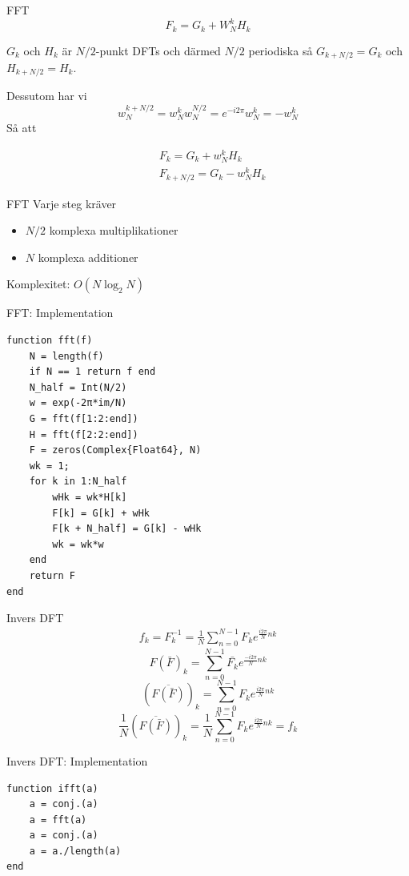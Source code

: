 \documentclass[presentation]{beamer}
\begin{document}
\begin{frame}[label={sec:orgf4f9786}]{FFT}
\[ F_{k} = G_{k} + W_{N}^{k}H_{k} \]

\(G_{k}\) och \(H_{k}\) är \(N/2\)-punkt DFTs och därmed \(N/2\) periodiska så
\(G_{k + N/2} = G_{k}\) och \(H_{k + N/2} = H_{k}\).

Dessutom har vi
\[ w_{N}^{k + N/2} = w_{N}^{k}w_{N}^{N/2} = e^{-i2 \pi}w_{N}^{k} = -w_{N}^{k} \]
Så att  

\begin{align*}
&F_{k} = G_{k} + w_{N}^{k}H_{k} \\
&F_{k + N/2} = G_{k} - w_{N}^{k}H_{k}
\end{align*}
\end{frame}

\begin{frame}[label={sec:orge294a38}]{FFT}
Varje steg kräver
\begin{itemize}
\item \(N/2\) komplexa multiplikationer
\item \(N\) komplexa additioner
\end{itemize}

Komplexitet: \(O(N \log_2{N})\)
\end{frame}

\begin{frame}[label={sec:orgba0e8ce},fragile]{FFT: Implementation}
 \begin{verbatim}
function fft(f)
    N = length(f)
    if N == 1 return f end
    N_half = Int(N/2)
    w = exp(-2π*im/N)
    G = fft(f[1:2:end])
    H = fft(f[2:2:end])
    F = zeros(Complex{Float64}, N)
    wk = 1;
    for k in 1:N_half
        wHk = wk*H[k]
        F[k] = G[k] + wHk
        F[k + N_half] = G[k] - wHk
        wk = wk*w
    end
    return F
end
\end{verbatim}
\end{frame}

\begin{frame}[label={sec:org7904db4}]{Invers DFT}
\begin{align*}
f_{k} = F_{k}^{-1} = \frac{1}{N}\sum_{n=0}^{N-1}F_{k}e^{\frac{i2 \pi}{N}nk}
\end{align*}
\pause
\begin{equation*}
  F(\bar{F})_{k} = \sum_{n=0}^{N-1}\bar{F_{k}}e^{\frac{-i2 \pi}{N}nk}
\end{equation*}
\pause
\begin{equation*}
  (\overline{F(\bar{F})})_{k} = \sum_{n=0}^{N-1}F_{k}e^{\frac{i2 \pi}{N}nk}
\end{equation*}
\pause
\begin{equation*}
    \frac{1}{N}(\overline{F(\bar{F})})_{k} =
  \frac{1}{N}\sum_{n=0}^{N-1}F_{k}e^{\frac{i2 \pi}{N}nk} = f_{k}
\end{equation*}

\newpage
\end{frame}

\begin{frame}[label={sec:org336728e},fragile]{Invers DFT: Implementation}
 \begin{verbatim}
function ifft(a)
    a = conj.(a)
    a = fft(a)
    a = conj.(a)
    a = a./length(a)
end
\end{verbatim}
\end{frame}
\end{document}
